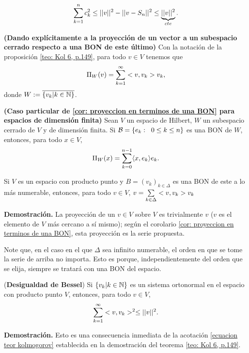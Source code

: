\begin{equation} \label{ecuacion teor kolmogorov}
\sum\limits_{k=1}^{n}c_{k}^{2} \leq ||v||^{2}-||v-S_{n}||^{2} \leq 
\underbrace{||v||^{2}}_{cte}.
\end{equation}

\QEDB
\vspace{0.2cm}


\begin{cor} \label{cor: proyeccion en terminos de una BON}
\textbf{(Dando explícitamente a la proyección de un vector
a un subespacio cerrado respecto a una BON de este último)}
Con la notación de la proposición \ref{teo: Kol 6, p.149},
para todo $v \in V$
tenemos que
\[
\Pi_{W}(v) = \sum\limits_{k=1}^{\infty}<v, v_{k}>v_{k},
\]
donde $W := \overline{\{v_{k}| k \in \mathbb{N} \}}$. 
\end{cor}

\begin{cor}
\textbf{(Caso particular de \ref{cor: proyeccion en terminos de una BON} para
espacios de dimensión finita)}
Sean $V$ un espacio de Hilbert, $W$ un subespacio cerrado de $V$
y de dimensión finita. Si 
$\mathcal{B} = \{ e_{k}: \hspace{0.2cm} 0 \leq k \leq n \}$
es una BON de $W$, entonces, para todo $x \in V$,
\[
\Pi_{W}(x) = \sum\limits_{k=0}^{n-1} \langle x, e_{k} \rangle e_{k}.
\]  
\end{cor}


\begin{cor} \label{cor: representacion de un vector respecto a una BON}
Si $V$ es un espacio con producto punto 
y $B=(v_{k})_{k \in \Delta}$ es una BON de este
a lo más numerable, entonces, para todo
$v \in V$, $v = \sum\limits_{k \in \Delta}^{}<v, v_{k}>v_{k}$
\end{cor}
\noindent
\textbf{Demostración.}
La proyección de un $v \in V$ sobre $V$ es trivialmente $v$
($v$ es el elemento de $V$ más cercano a sí mismo); según el corolario
\ref{cor: proyeccion en terminos de una BON}, esta
proyección es la serie propuesta. \QEDB
\vspace{0.2cm}

Note que, en el caso en el que $\Delta$ sea infinito numerable,
el orden en que se tome la serie de arriba no importa. Esto es porque,
independientemente del orden que se elija, siempre se tratará con
una BON del espacio. \\

\begin{cor}(\textbf{Desigualdad de Bessel})
Si $\{ v_{k} | k \in \mathbb{N} \}$ es un sistema ortonormal en 
el espacio con producto punto $V$, entonces, para todo $v\in V$,
\[
\sum\limits_{k=1}^{\infty}<v , v_{k} >^{2} \leq ||v||^{2}.
\]
\end{cor}
\noindent
\textbf{Demostración.}
Esto es una consecuencia inmediata de la acotación
\eqref{ecuacion teor kolmogorov} establecida en la demostración
del teorema \ref{teo: Kol 6, p.149}.
\QEDB
\vspace{0.2cm}



